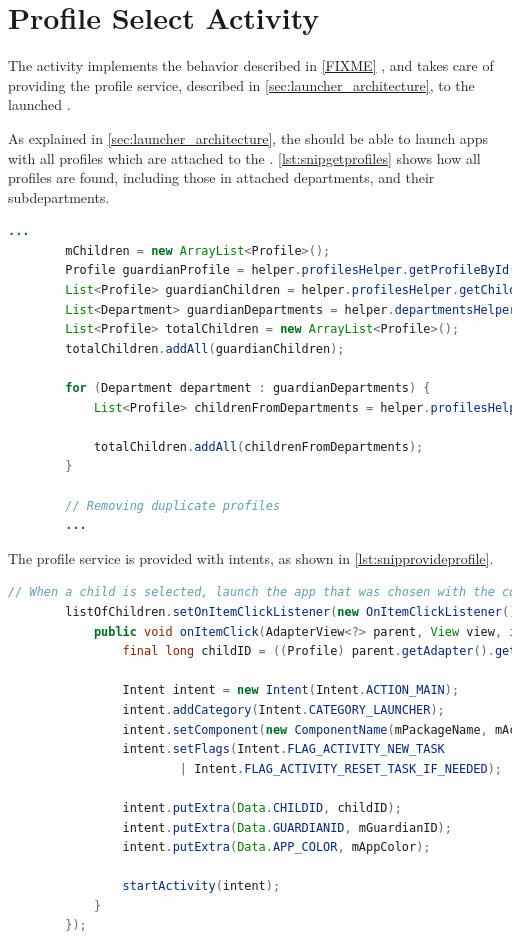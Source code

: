 \section{Profile Select Activity}

The  activity implements the behavior described in \autoref{FIXME} , and takes care of providing the profile service, described in \autoref{sec:launcher_architecture}, to the launched \girafapp[].

As explained in \autoref{sec:launcher_architecture}, the \guardian[] should be able to launch apps with all profiles which are attached to the \guardian[]. \autoref{lst:snipgetprofiles} shows how all profiles are found, including those in attached departments, and their subdepartments.

\begin{lstlisting}[style=sourceCode, language=JAVA, caption=Snippet of the \method{loadApplications} method, label=lst:snipgetprofiles]
		...
		mChildren = new ArrayList<Profile>();
		Profile guardianProfile = helper.profilesHelper.getProfileById(mGuardianID);
		List<Profile> guardianChildren = helper.profilesHelper.getChildrenByGuardian(guardianProfile);
		List<Department> guardianDepartments = helper.departmentsHelper.getDepartmentsByProfile(guardianProfile);
		List<Profile> totalChildren = new ArrayList<Profile>();
		totalChildren.addAll(guardianChildren);
		
		for (Department department : guardianDepartments) {
			List<Profile> childrenFromDepartments = helper.profilesHelper.getChildrenByDepartmentAndSubDepartments(department);
			
			totalChildren.addAll(childrenFromDepartments);
		}
		
		// Removing duplicate profiles
		...
\end{lstlisting}

The profile service is provided with intents, as shown in \autoref{lst:snipprovideprofile}.

\begin{lstlisting}[style=sourceCode, language=JAVA, caption=Snippet of the \method{loadApplications} method, label=lst:snipprovideprofile]
		// When a child is selected, launch the app that was chosen with the correct data in the extras.
		listOfChildren.setOnItemClickListener(new OnItemClickListener() {
			public void onItemClick(AdapterView<?> parent, View view, int position, long id) {
				final long childID = ((Profile) parent.getAdapter().getItem(position)).getId();

				Intent intent = new Intent(Intent.ACTION_MAIN);
				intent.addCategory(Intent.CATEGORY_LAUNCHER);
				intent.setComponent(new ComponentName(mPackageName, mActivityName));
				intent.setFlags(Intent.FLAG_ACTIVITY_NEW_TASK
						| Intent.FLAG_ACTIVITY_RESET_TASK_IF_NEEDED);

				intent.putExtra(Data.CHILDID, childID);
				intent.putExtra(Data.GUARDIANID, mGuardianID);
				intent.putExtra(Data.APP_COLOR, mAppColor);

				startActivity(intent);
			}
		});
\end{lstlisting}

